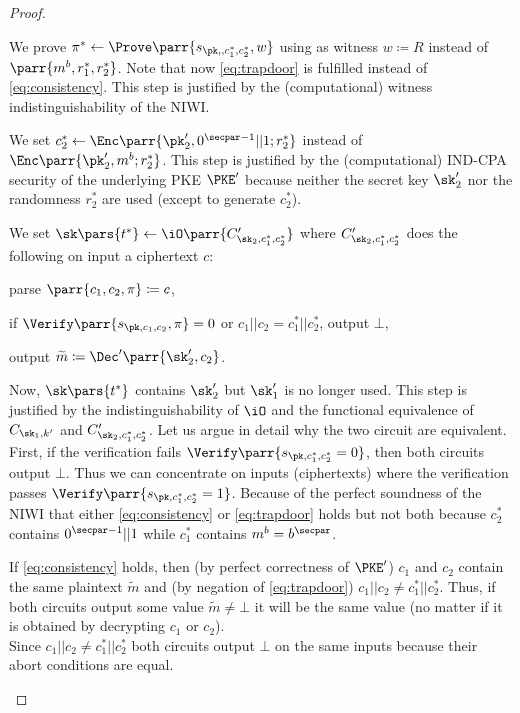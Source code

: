 \begin{proof}
\begin{hybrids}
        \item We prove \(\pi^* \gets \Prove\parr{s_{\pk,,c^*_1,c^*_2},w}\) using as witness \(w \coloneqq R\) instead of \(\parr{m^b,r^*_1,r^*_2}\).
        Note that now \cref{eq:trapdoor} is fulfilled instead of \cref{eq:consistency}.
        This step is justified by the (computational) witness indistinguishability of the NIWI.

        \item We set \(c^*_2 \gets \Enc\parr{\pk'_2,0^{\secpar-1}||1;r^*_2}\) instead of \(\Enc\parr{\pk'_2,m^b;r^*_2}\).
        This step is justified by the (computational) IND-CPA security of the underlying PKE \(\PKE'\) because neither the secret key \(\sk'_2\) nor the randomness \(r^*_2\) are used (except to generate \(c^*_2\)).

        \item We set \(\sk\pars{t^*} \gets \iO\parr{C'_{\sk_2,c^*_1,c^*_2}}\) where \(C'_{\sk_2,c^*_1,c^*_2}\) does the following on input a ciphertext \(c\):
        \begin{sitemize}
            \item parse \(\parr{c_1,c_2,\pi} \coloneqq c\),
            \item if \(\Verify\parr{s_{\pk,c_1,c_2},\pi} = 0\) or \(c_1||c_2 = c^*_1||c^*_2\), output \(\bot\),
            \item output \(\widetilde{m} \coloneqq \Dec'\parr{\sk'_2,c_2}\).
        \end{sitemize}
        Now, \(\sk\pars{t^*}\) contains \(\sk'_2\) but \(\sk'_1\) is no longer used.
        This step is justified by the indistinguishability of \(\iO\) and the functional equivalence of \(C_{\sk_1,k'}\) and \(C'_{\sk_2,c^*_1,c^*_2}\).
        Let us argue in detail why the two circuit are equivalent.
        First, if the verification fails \(\Verify\parr{s_{\pk,c^*_1,c^*_2} = 0}\),
        then both circuits output \(\bot\).
        Thus we can concentrate on inputs (ciphertexts) where the verification passes \(\Verify\parr{s_{\pk,c^*_1,c^*_2} = 1}\).
        Because of the perfect soundness of the NIWI that either \cref{eq:consistency} or \cref{eq:trapdoor} holds but not both because \(c^*_2\) contains \(0^{\secpar-1}||1\) while \(c^*_1\) contains \(m^b = b^\secpar\).
        \begin{sitemize}
            \item If \cref{eq:consistency} holds,
            then (by perfect correctness of \(\PKE'\)) \(c_1\) and \(c_2\) contain the same plaintext \(\widetilde{m}\) and (by negation of \cref{eq:trapdoor}) \(c_1||c_2 \neq c^*_1||c^*_2\).
            Thus, if both circuits output some value \(\widetilde{m} \neq \bot\) it will be the same value (no matter if it is obtained by decrypting \(c_1\) or \(c_2\)).
            \\
            Since \(c_1||c_2 \neq c^*_1||c^*_2\) both circuits output \(\bot\) on the same inputs because their abort conditions are equal.


\end{sitemize}
\end{hybrids}
\end{proof}
